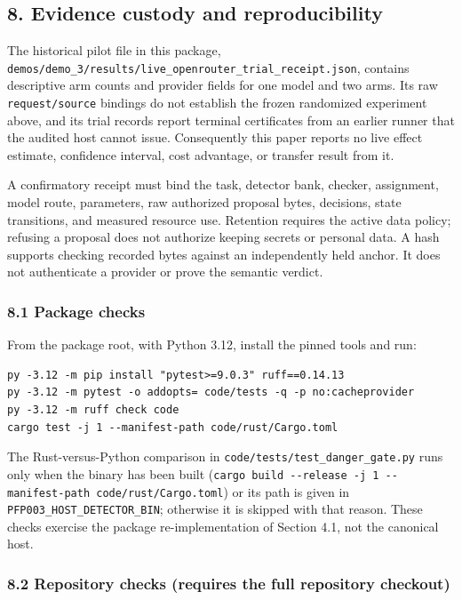 \documentclass[
  11pt,
]{article}
\newcommand{\passthrough}[1]{#1}
\begin{document}
\subsection{8. Evidence custody and
reproducibility}\label{evidence-custody-and-reproducibility}

The historical pilot file in this package,
\nolinkurl{demos/demo_3/results/live_openrouter_trial_receipt.json},
contains descriptive arm counts and provider fields for one model and
two arms. Its raw \nolinkurl{request/source} bindings do not establish
the frozen randomized experiment above, and its trial records report
terminal certificates from an earlier runner that the audited host
cannot issue. Consequently this paper reports no live effect estimate,
confidence interval, cost advantage, or transfer result from it.

A confirmatory receipt must bind the task, detector bank, checker,
assignment, model route, parameters, raw authorized proposal bytes,
decisions, state transitions, and measured resource use. Retention
requires the active data policy; refusing a proposal does not authorize
keeping secrets or personal data. A hash supports checking recorded
bytes against an independently held anchor. It does not authenticate a
provider or prove the semantic verdict.

\subsubsection{8.1 Package checks}\label{package-checks}

From the package root, with Python 3.12, install the pinned tools and
run:

\begin{lstlisting}
py -3.12 -m pip install "pytest>=9.0.3" ruff==0.14.13
py -3.12 -m pytest -o addopts= code/tests -q -p no:cacheprovider
py -3.12 -m ruff check code
cargo test -j 1 --manifest-path code/rust/Cargo.toml
\end{lstlisting}

The Rust-versus-Python comparison in
\nolinkurl{code/tests/test_danger_gate.py} runs only when the binary has
been built
(\passthrough{\lstinline!cargo build --release -j 1 --manifest-path code/rust/Cargo.toml!})
or its path is given in \nolinkurl{PFP003_HOST_DETECTOR_BIN}; otherwise
it is skipped with that reason. These checks exercise the package
re-implementation of Section 4.1, not the canonical host.

\subsubsection{8.2 Repository checks (requires the full repository
checkout)}\label{repository-checks-requires-the-full-repository-checkout}
\end{document}
